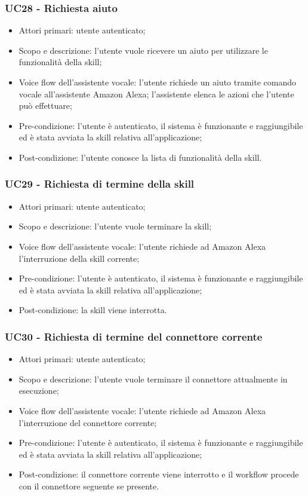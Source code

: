 \subsubsection{UC28 - Richiesta aiuto}
\begin{itemize}
	\item Attori primari: utente autenticato;
	\item Scopo e descrizione: l'utente vuole ricevere un aiuto per utilizzare le funzionalità della skill;
	\item Voice flow dell'assistente vocale: l'utente richiede un aiuto tramite comando vocale all'assistente Amazon Alexa; l'assistente elenca le azioni che l'utente può effettuare;
	\item Pre-condizione: l'utente è autenticato, il sistema è funzionante e raggiungibile ed è stata avviata la skill relativa all'applicazione;
	\item Post-condizione: l'utente conosce la lista di funzionalità della skill.
\end{itemize}
\subsubsection{UC29 - Richiesta di termine della skill}
\begin{itemize}
	\item Attori primari: utente autenticato;
	\item Scopo e descrizione: l'utente vuole terminare la skill;
	\item Voice flow dell'assistente vocale: l'utente richiede ad Amazon Alexa l'interruzione della skill corrente;
	\item Pre-condizione: l'utente è autenticato, il sistema è funzionante e raggiungibile ed è stata avviata la skill relativa all'applicazione;
	\item Post-condizione: la skill viene interrotta.
\end{itemize}
\subsubsection{UC30 - Richiesta di termine del connettore corrente}
\begin{itemize}
	\item Attori primari: utente autenticato;
	\item Scopo e descrizione: l'utente vuole terminare il connettore attualmente in esecuzione;
	\item Voice flow dell'assistente vocale: l'utente richiede ad Amazon Alexa l'interruzione del connettore corrente;
	\item Pre-condizione: l'utente è autenticato, il sistema è funzionante e raggiungibile ed è stata avviata la skill relativa all'applicazione;
	\item Post-condizione: il connettore corrente viene interrotto e il workflow procede con il connettore seguente se presente.
\end{itemize}
